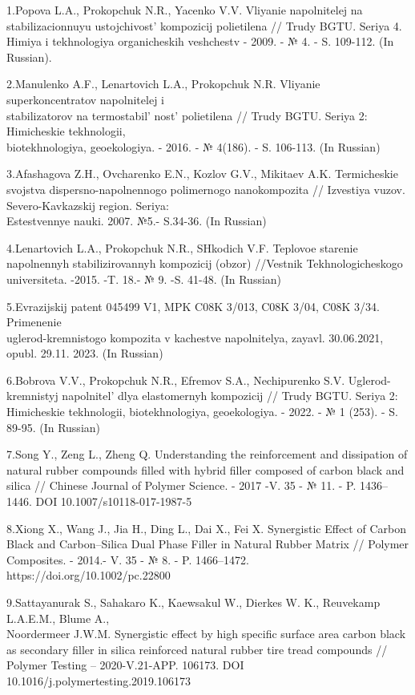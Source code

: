 \begin{references}
1.Popova L.A., Prokopchuk N.R., Yacenko V.V. Vliyanie napolnitelej na
stabilizacionnuyu ustojchivost'{} kompozicij polietilena
// Trudy BGTU. Seriya 4. Himiya i tekhnologiya organicheskih veshchestv
- 2009. - № 4. - S. 109-112. (In Russian).

2.Manulenko A.F., Lenartovich L.A., Prokopchuk N.R. Vliyanie
superkoncentratov napolnitelej i \\stabilizatorov na
termostabil' nost'{} polietilena // Trudy
BGTU. Seriya 2: Himicheskie tekhnologii,\\ biotekhnologiya, geoekologiya.
- 2016. - № 4(186). - S. 106-113. (In Russian)

3.Afashagova Z.H., Ovcharenko E.N., Kozlov G.V., Mikitaev A.K.
Termicheskie svojstva dispersno-napolnennogo polimernogo nanokompozita
// Izvestiya vuzov. Severo-Kavkazskij region. Seriya:\\ Estestvennye
nauki. 2007. №5.- S.34-36. (In Russian)

4.Lenartovich L.A., Prokopchuk N.R., SHkodich V.F. Teplovoe starenie
napolnennyh stabilizirovannyh kompozicij (obzor) //Vestnik
Tekhnologicheskogo universiteta. -2015. -T. 18.- № 9. -S. 41-48. (In
Russian)

5.Evrazijskij patent 045499 V1, MPK C08K 3/013, C08K 3/04, C08K 3/34.
Primenenie \\uglerod-kremnistogo kompozita v kachestve napolnitelya,
zayavl. 30.06.2021, opubl. 29.11. 2023. (In Russian)

6.Bobrova V.V., Prokopchuk N.R., Efremov S.A., Nechipurenko S.V.
Uglerod-kremnistyj napolnitel'{} dlya elastomernyh
kompozicij // Trudy BGTU. Seriya 2: Himicheskie tekhnologii,
biotekhnologiya, geoekologiya. - 2022. - № 1 (253). - S. 89-95. (In
Russian)

7.Song Y., Zeng L., Zheng Q. Understanding the reinforcement and
dissipation of natural rubber compounds filled with hybrid filler
composed of carbon black and silica // Chinese Journal of Polymer
Science. - 2017 -V. 35 - № 11. - P. 1436--1446. DOI
10.1007/s10118-017-1987-5

8.Xiong X., Wang J., Jia H., Ding L., Dai X., Fei X. Synergistic Effect
of Carbon Black and Carbon--Silica Dual Phase Filler in Natural Rubber
Matrix // Polymer Composites. - 2014.- V. 35 - № 8. - P. 1466--1472.
https://doi.org/10.1002/pc.22800

9.Sattayanurak S., Sahakaro K., Kaewsakul W., Dierkes W. K., Reuvekamp
L.A.E.M., Blume A., \\Noordermeer J.W.M. Synergistic effect by high
specific surface area carbon black as secondary filler in silica
reinforced natural rubber tire tread compounds // Polymer Testing --
2020-V.21-APP. 106173. DOI 10.1016/j.polymertesting.2019.106173


\end{references}
